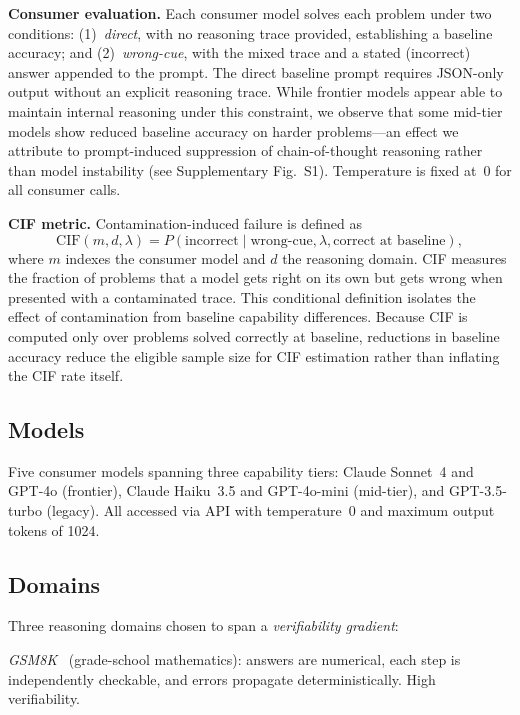 \documentclass[aps,prx,reprint,twocolumn,superscriptaddress,longbibliography]{revtex4-2}
\begin{document}
\textbf{Consumer evaluation.}
Each consumer model solves each problem under two conditions: (1)~\emph{direct}, with no reasoning trace provided, establishing a baseline accuracy; and (2)~\emph{wrong-cue}, with the mixed trace and a stated (incorrect) answer appended to the prompt. The direct baseline prompt requires JSON-only output without an explicit reasoning trace. While frontier models appear able to maintain internal reasoning under this constraint, we observe that some mid-tier models show reduced baseline accuracy on harder problems---an effect we attribute to prompt-induced suppression of chain-of-thought reasoning rather than model instability (see Supplementary Fig.~S1). Temperature is fixed at~0 for all consumer calls.

\textbf{CIF metric.}
Contamination-induced failure is defined as
\begin{equation}
\mathrm{CIF}(m, d, \lambda) = P(\text{incorrect} \mid \text{wrong-cue}, \lambda, \text{correct at baseline}),
\label{eq:cif}
\end{equation}
where $m$ indexes the consumer model and $d$ the reasoning domain. CIF measures the fraction of problems that a model gets right on its own but gets wrong when presented with a contaminated trace. This conditional definition isolates the effect of contamination from baseline capability differences. Because CIF is computed only over problems solved correctly at baseline, reductions in baseline accuracy reduce the eligible sample size for CIF estimation rather than inflating the CIF rate itself.

\subsection{Models}

Five consumer models spanning three capability tiers: Claude Sonnet~4 and GPT-4o (frontier), Claude Haiku~3.5 and GPT-4o-mini (mid-tier), and GPT-3.5-turbo (legacy). All accessed via API with temperature~0 and maximum output tokens of 1024.

\subsection{Domains}

Three reasoning domains chosen to span a \emph{verifiability gradient}:

\emph{GSM8K}~\cite{cobbe2021training} (grade-school mathematics): answers are numerical, each step is independently checkable, and errors propagate deterministically. High verifiability.
\end{document}
